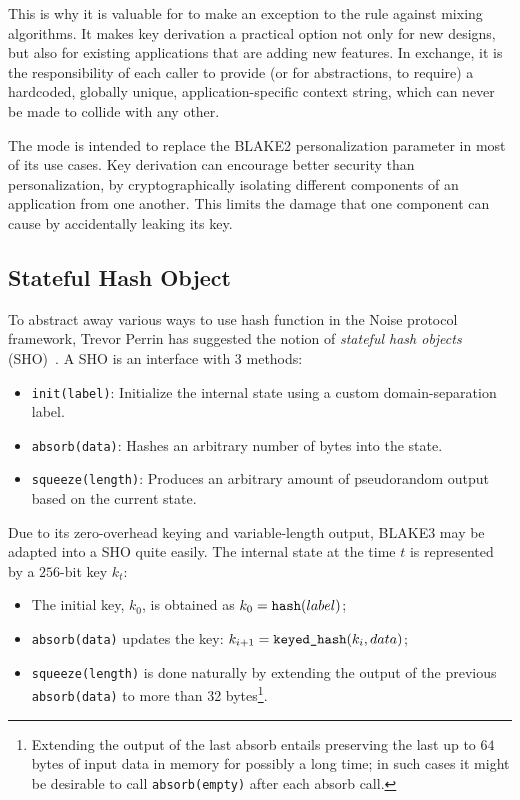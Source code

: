\documentclass[11pt,notitlepage,a4paper]{article}
\newcommand{\flag}[1]{\texttt{\detokenize{#1}}\xspace}
\begin{document}
This is why it is valuable for \flag{derive_key} to make an exception to the
rule against mixing algorithms. It makes key derivation a practical option not
only for new designs, but also for existing applications that are adding new
features. In exchange, it is the responsibility of each caller to provide (or
for abstractions, to require) a hardcoded, globally unique,
application-specific context string, which can never be made to collide with
any other.

The \flag{derive_key} mode is intended to replace the BLAKE2 personalization
parameter in most of its use cases. Key derivation can encourage better
security than personalization, by cryptographically isolating different
components of an application from one another. This limits the damage that one
component can cause by accidentally leaking its key.

\subsection{Stateful Hash Object}\label{sec:sho}

To abstract away various ways to use hash function in the Noise protocol framework, Trevor Perrin has suggested the notion of \emph{stateful hash objects} (SHO)~\cite{Perrin19}. A SHO is an interface with 3 methods:
\begin{itemize}
  \item \texttt{init(label)}: Initialize the internal state using a custom domain-separation label.
  \item \texttt{absorb(data)}: Hashes an arbitrary number of bytes into the state.
  \item \texttt{squeeze(length)}: Produces an arbitrary amount of pseudorandom output based on the current state.
\end{itemize}
Due to its zero-overhead keying and variable-length output, BLAKE3 may be adapted into a SHO quite easily. The internal state at the time $t$ is represented by a $256$-bit key $k_t$:
\begin{itemize}
  \item The initial key, $k_0$, is obtained as $k_0 = \text{\flag{hash}}(label)$;
  \item \texttt{absorb(data)} updates the key: $k_{i+1} = \text{\flag{keyed_hash}}(k_i, data)$;
  \item \texttt{squeeze(length)} is done naturally by extending the output of the previous \texttt{absorb(data)} to more than 32 bytes\footnote{Extending the output of the last absorb entails preserving the last up to $64$ bytes of input data in memory for possibly a long time; in such cases it might be desirable to call \texttt{absorb(empty)} after each absorb call.}.
\end{itemize}
\end{document}
